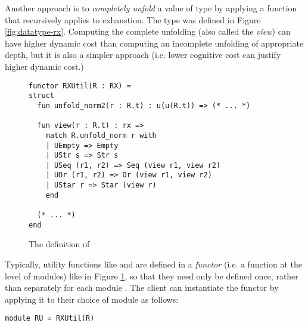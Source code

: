 Another approach is to \emph{completely unfold} a value of type  by applying a function  that recursively applies  to exhaustion. The type  was defined in Figure \ref{fig:datatype-rx}.  Computing the complete unfolding (also called the \emph{view}) can have higher dynamic cost than computing an incomplete unfolding of appropriate depth, but it is also a simpler approach (i.e.   lower cognitive cost can justify higher dynamic cost.)


\begin{figure}[t]
\begin{lstlisting}[numbers=none]
functor RXUtil(R : RX) = 
struct
  fun unfold_norm2(r : R.t) : u(u(R.t)) => (* ... *)

  fun view(r : R.t) : rx => 
    match R.unfold_norm r with 
    | UEmpty => Empty
    | UStr s => Str s
    | USeq (r1, r2) => Seq (view r1, view r2)
    | UOr (r1, r2) => Or (view r1, view r2)
    | UStar r => Star (view r)
    end 

  (* ... *)
end
\end{lstlisting}
\vspace{-5px}
\caption{The definition of }
\vspace{-5px}
\label{fig:RXUtil}
\end{figure}
Typically, utility functions like  and  are defined in a \emph{functor} (i.e. a function at the level of modules) like  in Figure \ref{fig:RXUtil}, so that they need only be defined once, rather than separately for each module . The client can instantiate the functor by applying it to their choice of module as follows:
\begin{lstlisting}[numbers=none]
module RU = RXUtil(R)
\end{lstlisting}
